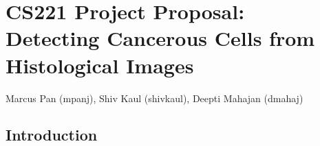 \documentclass[11pt, oneside]{article}
\begin{document}
\medskip

\section*{CS221 Project Proposal: \\
Detecting Cancerous Cells from Histological Images}

Marcus Pan (mpanj), Shiv Kaul (shivkaul), Deepti Mahajan (dmahaj)

\subsection*{Introduction}
\end{document}
